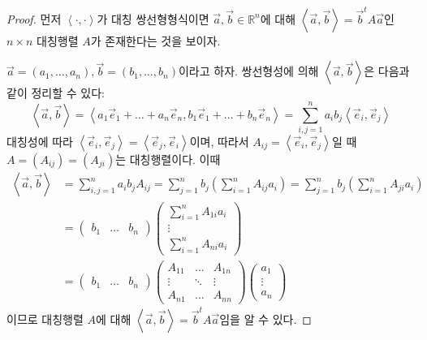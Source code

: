 \documentclass[sections/engineering_mathematics_lecture_note.tex]{subfiles}
\begin{document}
\begin{proof}
    먼저 $\left<\cdot, \cdot\right>$가 대칭 쌍선형형식이면 $\vec a, \vec b \in \mathbb R^n$에 대해 $\left<\vec a, \vec b\right> = \vec b^t A \vec a$인 $n \times n$ 대칭행렬 $A$가 존재한다는 것을 보이자.

    $\vec a = (a_1, \dots, a_n), \vec b = (b_1, \dots, b_n)$이라고 하자.
    쌍선형성에 의해 $\left<\vec a, \vec b\right>$은 다음과 같이 정리할 수 있다:
    \begin{equation*}
        \left<\vec a, \vec b\right> = \left<a_1 \vec e_1 + \dots + a_n \vec e_n, b_1 \vec e_1 + \dots + b_n \vec e_n\right> = \sum_{i, j = 1}^n a_i b_j \left<\vec e_i, \vec e_j\right>
    \end{equation*}
    대칭성에 따라 $\left<\vec e_i, \vec e_j\right> = \left<\vec e_j, \vec e_i\right>$이며, 따라서 $A_{ij} = \left<\vec e_i, \vec e_j\right>$일 때 $A = (A_{ij}) = (A_{ji})$는 대칭행렬이다.
    이때
    \begin{align*}
        \left<\vec a, \vec b \right> &= \sum_{i, j = 1}^n a_i b_j A_{ij} = \sum_{j = 1}^n b_j \left(\sum_{i = 1}^n A_{ij} a_i\right) = \sum_{j = 1}^n b_j \left(\sum_{i = 1}^n A_{ji} a_i\right)\\
                                     &=
                                     \begin{pmatrix}
                                         b_1 & \dots & b_n
                                     \end{pmatrix}
                                     \begin{pmatrix}
                                         \sum_{i = 1}^n A_{1i} a_i\\
                                         \vdots\\
                                         \sum_{i = 1}^n A_{ni} a_i
                                     \end{pmatrix}\\
                                     &=
                                     \begin{pmatrix}
                                         b_1 & \dots & b_n
                                     \end{pmatrix}
                                     \begin{pmatrix}
                                         A_{11} & \dots & A_{1n}\\
                                         \vdots & \ddots & \vdots\\
                                         A_{n1} & \dots & A_{nn}
                                     \end{pmatrix}
                                     \begin{pmatrix}
                                         a_1\\
                                         \vdots\\
                                         a_n
                                     \end{pmatrix}
    \end{align*}
    이므로 대칭행렬 $A$에 대해 $\left<\vec a, \vec b\right> = \vec b^t A \vec a$임을 알 수 있다.


\end{proof}
\end{document}
